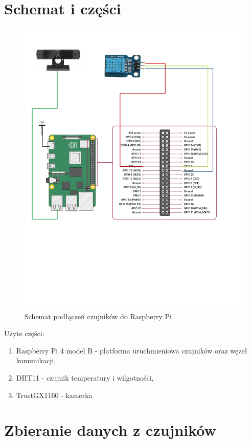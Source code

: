 \documentclass[runningheads]{llncs}
\begin{document}
\section{Schemat i części}
\begin{figure}
  \centering
  \includegraphics[width=\textwidth]{schemat.jpg}
\caption{Schemat podłączeń czujników do Raspberry Pi} \label{fig1}
\end{figure}
Użyte części:
\begin{enumerate}
\item Raspberry Pi 4 model B - platforma uruchmieniowa czujników oraz węzeł komunikacji,
\item DHT11 - czujnik temperatury i wilgotności,
\item TrustGX1160 - kamerka
\end{enumerate}

\section{Zbieranie danych z czujników}
\end{document}
